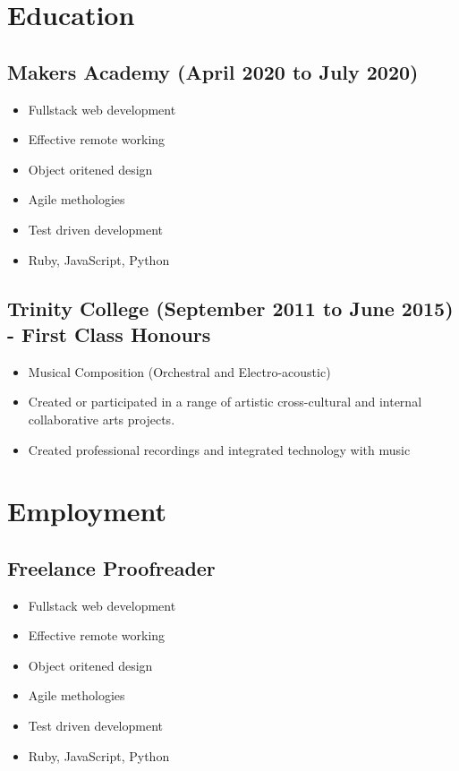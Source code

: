 \documentclass[12pt]{IEEEtran}
\begin{document}
\section*{Education}

\subsection*{Makers Academy (April 2020 to July 2020)}

\begin{itemize}
\item Fullstack web development
\item Effective remote working
\item Object oritened design
\item Agile methologies
\item Test driven development
\item Ruby, JavaScript, Python
\end{itemize}

\subsection*{Trinity College (September 2011 to June 2015) - First Class Honours}
\begin{itemize}
\item Musical Composition (Orchestral and Electro-acoustic)
\item Created or participated in a range of artistic cross-cultural and internal collaborative arts projects.
\item Created professional recordings and integrated technology with music
\end{itemize}

\section*{Employment}

\subsection*{Freelance Proofreader}

\begin{itemize}
\item Fullstack web development
\item Effective remote working
\item Object oritened design
\item Agile methologies
\item Test driven development
\item Ruby, JavaScript, Python
\end{itemize}
\end{document}
